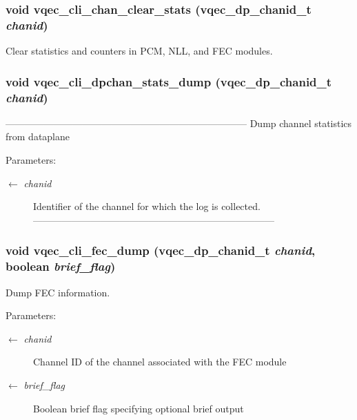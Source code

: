 \subsubsection{\setlength{\rightskip}{0pt plus 5cm}void vqec\_\-cli\_\-chan\_\-clear\_\-stats (vqec\_\-dp\_\-chanid\_\-t {\em chanid})}\label{vqec__cli__interface_8h_34bbe0724a2e6cf8f8eb824e478210c6}


Clear statistics and counters in PCM, NLL, and FEC modules. 
\subsubsection{\setlength{\rightskip}{0pt plus 5cm}void vqec\_\-cli\_\-dpchan\_\-stats\_\-dump (vqec\_\-dp\_\-chanid\_\-t {\em chanid})}\label{vqec__cli__interface_8h_b70d2621906c01cf3c5874319926fe68}


--------------------------------------------------------------------------- Dump channel statistics from dataplane

\begin{Desc}
\item[Parameters:]
\begin{description}
\item[\mbox{$\leftarrow$} {\em chanid}]Identifier of the channel for which the log is collected. --------------------------------------------------------------------------- \end{description}
\end{Desc}
\subsubsection{\setlength{\rightskip}{0pt plus 5cm}void vqec\_\-cli\_\-fec\_\-dump (vqec\_\-dp\_\-chanid\_\-t {\em chanid}, boolean {\em brief\_\-flag})}\label{vqec__cli__interface_8h_440176cbfc55e70c9de15c9adfa1342b}


Dump FEC information.

\begin{Desc}
\item[Parameters:]
\begin{description}
\item[\mbox{$\leftarrow$} {\em chanid}]Channel ID of the channel associated with the FEC module \item[\mbox{$\leftarrow$} {\em brief\_\-flag}]Boolean brief flag specifying optional brief output \end{description}
\end{Desc}
